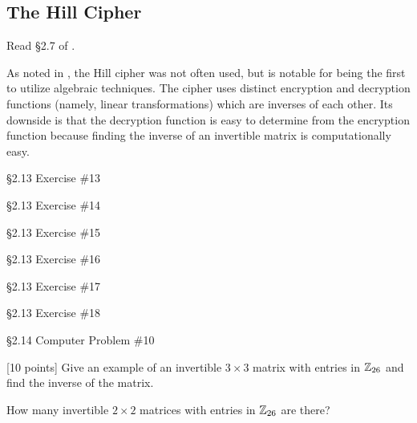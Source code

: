 		\subsection{The Hill Cipher} 
		\label{sssec:hill}
		Read \S 2.7 of \cite{tw}.

As noted in \cite{tw}, the Hill cipher was not often used, but is notable for being the first to utilize algebraic techniques. The cipher uses distinct encryption and decryption functions (namely, linear transformations) which are inverses of each other. Its downside is that the decryption function is easy to determine from the encryption function because finding the inverse of an invertible matrix is computationally easy.

\begin{problem} [10 points]
\S 2.13 Exercise \#13
\end{problem}

\begin{problem} [10 points]
\S 2.13 Exercise \#14
\end{problem}

\begin{problem} [15 points]
\S 2.13 Exercise \#15
\end{problem}

\begin{problem} [15 points]
\S 2.13 Exercise \#16
\end{problem}

\begin{problem} [15 points]
\S 2.13 Exercise \#17
\end{problem}

\begin{problem} [20 points]
\S 2.13 Exercise \#18
\end{problem}

\begin{problem} [10 points]
\S 2.14 Computer Problem \#10
\end{problem}

\begin{problem}
\label{prob:hill1}  [10 points]
Give an example of an invertible $3\times 3$ matrix with entries in $\mathbb{Z}_{26}$ and find the inverse of the matrix.
\end{problem}

\begin{problem}  [10 points]
How many invertible $2\times 2$ matrices with entries in $\mathbb{Z}_{26}$ are there?
\end{problem}


